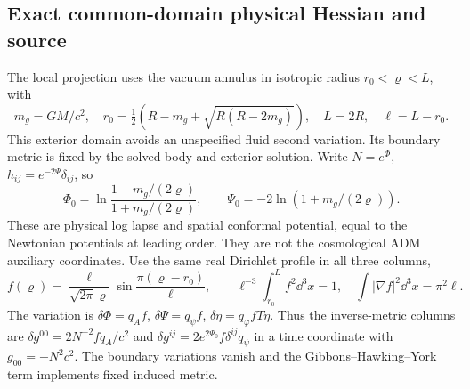 \subsection{Exact common-domain physical Hessian and source}
The local projection uses the vacuum annulus in isotropic radius
$r_0<\varrho<L$, with
\begin{equation}
 m_g=GM/c^2,\quad r_0=\tfrac12(R-m_g+\sqrt{R(R-2m_g)}),
 \quad L=2R,\quad \ell=L-r_0.
\end{equation}
This exterior domain avoids an unspecified fluid second variation.
Its boundary metric is fixed by the solved body and exterior solution.
Write $N=e^\Phi$, $h_{ij}=e^{-2\Psi}\delta_{ij}$, so
\begin{equation}
 \Phi_0=\ln\frac{1-m_g/(2\varrho)}{1+m_g/(2\varrho)},\qquad
 \Psi_0=-2\ln(1+m_g/(2\varrho)).
\end{equation}
These are physical log lapse and spatial conformal potential, equal to
the Newtonian potentials at leading order. They are not the cosmological
ADM auxiliary coordinates.
Use the same real Dirichlet profile in all three columns,
\begin{equation}
 f(\varrho)=\frac{\ell}{\sqrt{2\pi}\varrho}
       \sin\frac{\pi(\varrho-r_0)}\ell,
 \qquad \ell^{-3}\int_{r_0}^{L} f^2\dd^3x=1,
 \quad \int|\nabla f|^2\dd^3x=\pi^2\ell .
\end{equation}
The variation is $\delta\Phi=q_Af$, $\delta\Psi=q_\psi f$,
$\delta\eta=q_\varphi f T\eta$. Thus the inverse-metric columns are
$\delta g^{00}=2N^{-2}f q_A/c^2$ and
$\delta g^{ij}=2e^{2\Psi_0}f\delta^{ij}q_\psi$ in a time coordinate
with $g_{00}=-N^2c^2$.
The boundary variations vanish and the Gibbons--Hawking--York term
implements fixed induced metric.

